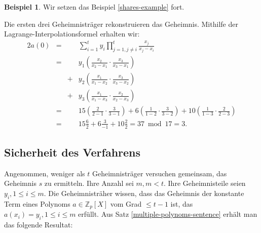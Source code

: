 \documentclass[12pt, a4paper, oneside, titlepage]{report}
\newcommand{\Z}{\mathds{Z}}
\theoremstyle{definition}
\newtheorem{bsp}[lemma]{Beispiel}
\begin{document}
	\begin{bsp}
		Wir setzen das Beispiel \ref{shares-example} fort.

		Die ersten drei Geheimnisträger rekonstruieren das Geheimnis. Mithilfe der Lagrange-Interpolationsformel erhalten wir:		
		\begin{alignat*}{2}
		a(0) & = & & \sum_{i=1}^{t} y_i \prod_{j=1, j \neq i}^{t} \frac{x_j}{x_j - x_i} \\
		       & = & & y_1  \left( \frac{x_2}{x_2 - x_1} \cdot \frac{x_3}{x_3 - x_1} \right) \\
		        &   & + &  y_2  \left( \frac{x_1}{x_1 - x_2} \cdot \frac{x_3}{x_3 - x_2} \right) \\
				&  &  + & y_3  \left( \frac{x_1}{x_1 - x_3} \cdot \frac{x_2}{x_2 - x_3} \right) \\
		& =&& 15 \left( \frac{2}{2 - 1} \cdot \frac{3}{3 - 1} \right) 
		+  6  \left( \frac{1}{1 - 2} \cdot \frac{3}{3 - 2} \right) 
		+ 10  \left( \frac{1}{1 - 3} \cdot \frac{2}{2 - 3} \right)\\
		&=&& 15 \frac{6}{2} + 6 \frac{3}{-1} + 10 \frac{2}{2} = 37 \bmod 17 = 3.
		\end{alignat*}
	\end{bsp}
	
	\subsection{Sicherheit des Verfahrens}
	
	Angenommen, weniger als $ t $ Geheimnisträger versuchen gemeinsam, das Geheimnis $ s $ zu ermitteln. Ihre Anzahl sei $ m, m < t $. Ihre Geheimnisteile seien $ y_i, 1 \leq i \leq m $. Die Geheimnisträher wissen, dass das Geheimnis der konstante Term eines Polynoms $ a \in \Z_p[X] $ vom Grad $ \leq t - 1 $ ist, das $ a(x_i) = y_i, 1 \leq i \leq m $ erfüllt. Aus Satz \ref{multiple-polynoms-sentence} erhält man das folgende Resultat:
	
\end{document}
